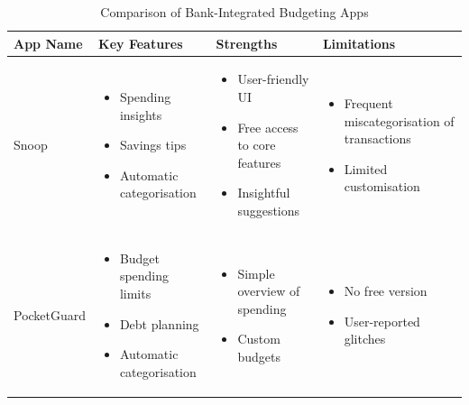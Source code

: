 \documentclass{l4proj}
\begin{document}
\begin{table}[H]
    \centering
    \caption{Comparison of Bank-Integrated Budgeting Apps}
    \begin{tabular}{|p{3cm}|p{3.5cm}|p{3.5cm}|p{3.5cm}|}
        \hline
        \textbf{App Name} & \textbf{Key Features} & \textbf{Strengths} & \textbf{Limitations} \\
        \hline
        Snoop & 
        \begin{itemize}[noitemsep, topsep=0pt, leftmargin=*]
            \item Spending insights
            \item Savings tips
            \item Automatic categorisation
        \end{itemize} &
        \begin{itemize}[noitemsep, topsep=0pt, leftmargin=*]
            \item User-friendly UI
            \item Free access to core features
            \item Insightful suggestions
        \end{itemize} &
        \begin{itemize}[noitemsep, topsep=0pt, leftmargin=*]
            \item Frequent miscategorisation of transactions
            \item Limited customisation
        \end{itemize} \\
        \hline
        PocketGuard &
        \begin{itemize}[noitemsep, topsep=0pt, leftmargin=*]
            \item Budget spending limits
            \item Debt planning
            \item Automatic categorisation
        \end{itemize} &
        \begin{itemize}[noitemsep, topsep=0pt, leftmargin=*]
            \item Simple overview of spending
            \item Custom budgets
        \end{itemize} &
        \begin{itemize}[noitemsep, topsep=0pt, leftmargin=*]
            \item No free version
            \item User-reported glitches

\end{itemize}
\end{tabular}
\end{table}
\end{document}
